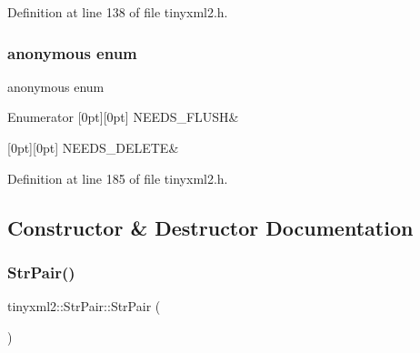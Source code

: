 Definition at line 138 of file tinyxml2.\+h.

\mbox{\label{classtinyxml2_1_1_str_pair_a476a92d76f24486c3ae4731916b12aae}} 
\subsubsection{anonymous enum}
{\footnotesize\ttfamily anonymous enum\hspace{0.3cm}{\ttfamily [private]}}

\begin{DoxyEnumFields}{Enumerator}
[0pt][0pt]{}\mbox{\label{classtinyxml2_1_1_str_pair_a476a92d76f24486c3ae4731916b12aaea2d8841daedc3955ed20ec9f760318434}} 
N\+E\+E\+D\+S\+\_\+\+F\+L\+U\+SH&\\
\hline

[0pt][0pt]{}\mbox{\label{classtinyxml2_1_1_str_pair_a476a92d76f24486c3ae4731916b12aaeab9a3152ce5df9e7f4bbf3774fe862c75}} 
N\+E\+E\+D\+S\+\_\+\+D\+E\+L\+E\+TE&\\
\hline

\end{DoxyEnumFields}


Definition at line 185 of file tinyxml2.\+h.



\subsection{Constructor \& Destructor Documentation}
\mbox{\label{classtinyxml2_1_1_str_pair_a69153963f7052de9f767d3d8c1623a70}} 
\subsubsection{Str\+Pair()\hspace{0.1cm}{\footnotesize\ttfamily [1/2]}}
{\footnotesize\ttfamily tinyxml2\+::\+Str\+Pair\+::\+Str\+Pair (\begin{DoxyParamCaption}{ }\end{DoxyParamCaption})\hspace{0.3cm}{\ttfamily [inline]}}



